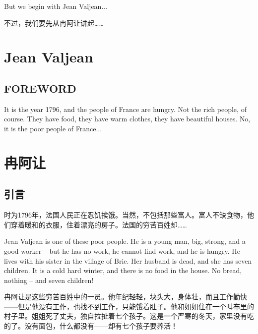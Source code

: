 \documentclass[fontset=ubuntu, zihao=5]{ctexart}
\begin{document}
\begin{paracol}{2}
  \switchcolumn*

  But we begin with Jean Valjean...


  \switchcolumn

  不过，我们要先从冉阿让讲起……

\end{paracol}

\clearpage

\begin{paracol}{2}

  \section{Jean Valjean}

  \subsection*{FOREWORD}

  It is the year 1796, and the people of France are hungry. Not the rich people, of course. They have food, they have warm clothes, they have beautiful houses. No, it is the poor people of France...

  \switchcolumn

  \section*{冉阿让}
  \subsection*{引言}

  时为1796年，法国人民正在忍饥挨饿。当然，不包括那些富人。富人不缺食物，他们穿着暖和的衣服，住着漂亮的房子。法国的穷苦百姓却……

  \switchcolumn*

  Jean Valjean is one of these poor people. He is a young man, big, strong, and a good worker – but he has no work, he cannot find work, and he is hungry. He lives with his sister in the village of Brie. Her husband is dead, and she has seven children. It is a cold hard winter, and there is no food in the house. No bread, nothing – and seven children!

  \switchcolumn
  冉阿让是这些穷苦百姓中的一员。他年纪轻轻，块头大，身体壮，而且工作勤快——但是他没有工作，也找不到工作，只能饿着肚子。他和姐姐住在一个叫布里的村子里。姐姐死了丈夫，独自拉扯着七个孩子。这是一个严寒的冬天，家里没有吃的了。没有面包，什么都没有——却有七个孩子要养活！


\end{paracol}
\end{document}
